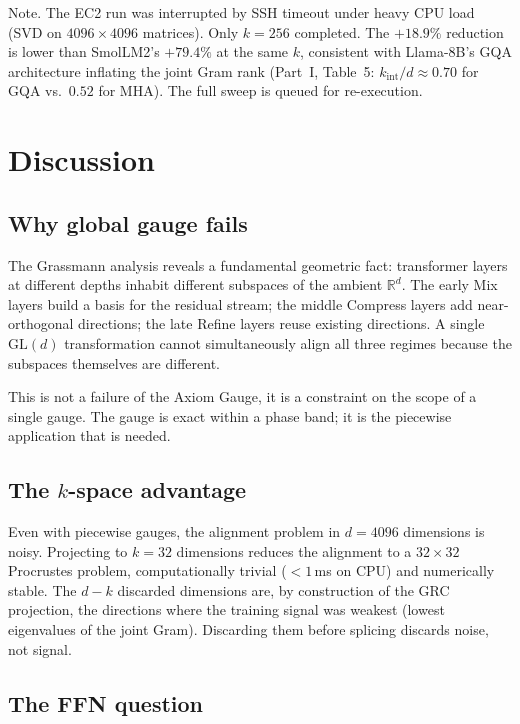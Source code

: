 \documentclass[11pt]{article}
\begin{document}
Note.  The EC2 run was interrupted by SSH timeout under heavy
CPU load (SVD on $4096\times4096$ matrices).  Only $k{=}256$ completed.
The $+18.9\%$ reduction is lower than SmolLM2's $+79.4\%$ at the same
$k$, consistent with Llama-8B's GQA architecture inflating the joint
Gram rank (Part~I, Table~5: $k_{\mathrm{int}}/d \approx 0.70$ for GQA
vs.\ $0.52$ for MHA).  The full sweep is queued for re-execution.

\section{Discussion}
\label{sec:discussion}

\subsection{Why global gauge fails}

The Grassmann analysis reveals a fundamental geometric fact:
transformer layers at different depths inhabit different subspaces
of the ambient $\mathbb{R}^d$.  The early Mix layers build a basis for
the residual stream; the middle Compress layers add near-orthogonal
directions; the late Refine layers reuse existing directions.  A single
$\mathrm{GL}(d)$ transformation cannot simultaneously align all three
regimes because the subspaces themselves are different.

This is not a failure of the Axiom Gauge, it is a constraint on the
scope of a single gauge.  The gauge is exact within a phase band;
it is the piecewise application that is needed.

\subsection{The $k$-space advantage}

Even with piecewise gauges, the alignment problem in $d{=}4096$
dimensions is noisy.  Projecting to $k{=}32$ dimensions reduces the
alignment to a $32\times32$ Procrustes problem, computationally
trivial ($<1$\,ms on CPU) and numerically stable.  The $d-k$ discarded
dimensions are, by construction of the GRC projection, the directions
where the training signal was weakest (lowest eigenvalues of the
joint Gram).  Discarding them before splicing discards noise, not
signal.

\subsection{The FFN question}
\end{document}
